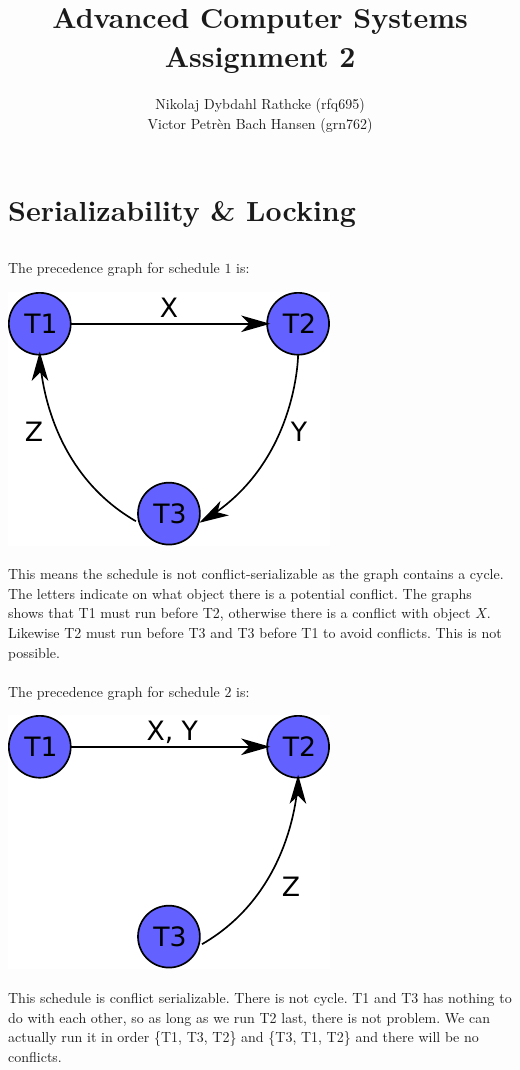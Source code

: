 \documentclass[a4paper]{article}
\author{Nikolaj Dybdahl Rathcke (rfq695) \\ Victor Petrèn Bach Hansen (grn762)}
\title{Advanced Computer Systems \\ Assignment 2}
\begin{document}
\maketitle

\section{Serializability \& Locking}

\subsection{}
The precedence graph for schedule $1$ is:
\begin{center}
    \includegraphics{fig1}
\end{center}
This means the schedule is not conflict-serializable as the graph contains a cycle. The letters indicate on what object there is a potential conflict. The graphs shows that T1 must run before T2, otherwise there is a conflict with object $X$. Likewise T2 must run before T3 and T3 before T1 to avoid conflicts. This is not possible. \\
\\
The precedence graph for schedule $2$ is:
\begin{center}
    \includegraphics{fig2}
\end{center}
This schedule is conflict serializable. There is not cycle. T1 and T3 has nothing to do with each other, so as long as we run T2 last, there is not problem. We can actually run it in order \{T1, T3, T2\} and \{T3, T1, T2\} and there will be no conflicts.
\end{document}
